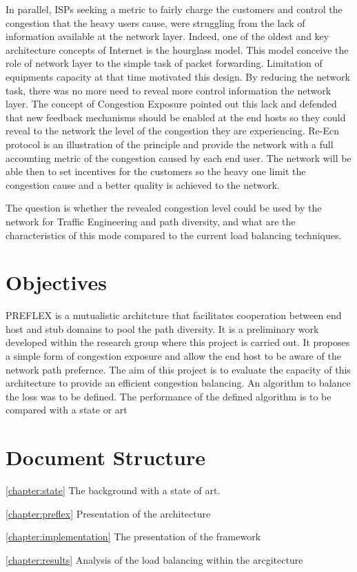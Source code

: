 In parallel, ISPs seeking a metric to fairly charge the customers and control the congestion that the heavy users cause, were struggling from the lack of information available at the network layer. Indeed, one of the oldest and key architecture concepts of Internet is the hourglass model. This model conceive the role of  network layer to the simple task of packet forwarding. Limitation of  equipments capacity at that time motivated this design. By reducing the network task, there was no more need to reveal more control information the network layer. The concept of Congestion Exposure pointed out this lack and defended that new feedback mechanisms should be enabled at the end hosts so they could reveal to the network the level of the congestion they are experiencing. Re-Ecn protocol is an illustration of the principle and provide the network with a full accounting metric of the congestion caused by each end user. The network will be able then to set incentives for the customers so the heavy one limit the congestion cause and a better quality is achieved to the network.

The question is whether the revealed congestion level could be used by the network for Traffic Engineering and path diversity, and what are the characteristics of this mode compared to the current load balancing techniques.

\section{Objectives}
PREFLEX is a mutualistic architcture that facilitates cooperation between end host and stub domains to pool the path diversity. It is a preliminary work developed within the research group where this project is carried out.
It proposes a simple form of congestion exposure and allow the end host to be aware of the network path prefernce. The aim of this project is to evaluate the capacity of this architecture to provide an efficient congestion balancing. An algorithm to balance the loss was to be defined.
The performance of the defined algorithm is to be compared with a state or art 

\section{Document Structure}

\ref{chapter:state}
The background with a state of art.

\ref{chapter:preflex}
Presentation of the architecture

\ref{chapter:implementation}
The presentation of the framework

\ref{chapter:results}
Analysis of the load balancing within the arcgitecture